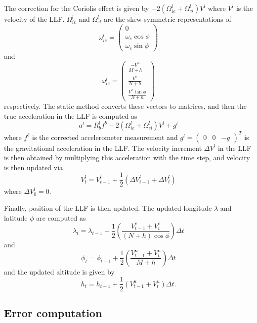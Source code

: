 \documentclass[11pt, oneside]{article}   	%
\begin{document}
The correction for the Coriolis effect is given by $-2(\Omega_{ie}^l+\Omega_{el}^l)V^l$ where $V^l$ is the velocity of the LLF.  $\Omega_{ie}^l$ and $\Omega_{el}^l$ are the skew-symmetric representations of 
$$\omega_{ie}^l=\begin{pmatrix}
0 \\
\omega_e\cos\phi \\
\omega_e\sin\phi
\end{pmatrix}$$
and
$$\omega_{le}^l=\begin{pmatrix}
\frac{-V^n}{M+h} \\[.1cm]
\frac{V^e}{N+h} \\[.1cm]
\frac{V^e\tan\phi}{N+h}
\end{pmatrix}$$
respectively.  The static method  converts these vectors to matrices, and then the true acceleration in the LLF is computed as
$$a^l=R_b^lf^b-2(\Omega_{ie}^l+\Omega_{el}^l)V^l+g^l$$
where $f^b$ is the corrected accelerometer measurement and $g^l=\begin{pmatrix}0&0&-g\end{pmatrix}^T$ is the gravitational acceleration in the LLF.  The velocity increment $\Delta V^l$ in the LLF is then obtained by multiplying this acceleration with the time step, and velocity is then updated via
$$V^l_t=V^l_{t-1}+\frac12\left(\Delta V^l_{t-1}+\Delta V^l_t\right)$$ 
where $\Delta V^l_0=0$.

Finally, position of the LLF is then updated.  The updated longitude $\lambda$ and latitude $\phi$ are computed as
$$\lambda_t=\lambda_{t-1}+\frac12\left(\frac{V^e_{t-1}+V^e_t}{(N+h)\cos\phi}\right)\Delta t$$
and
$$\phi_t=\phi_{t-1}+\frac12\left(\frac{V^n_{t-1}+V^n_t}{M+h}\right)\Delta t$$
and the updated altitude is given by
$$h_t=h_{t-1}+\frac12\left(V^u_{t-1}+V^u_t\right)\Delta t.$$

\subsection{Error computation}
\end{document}
